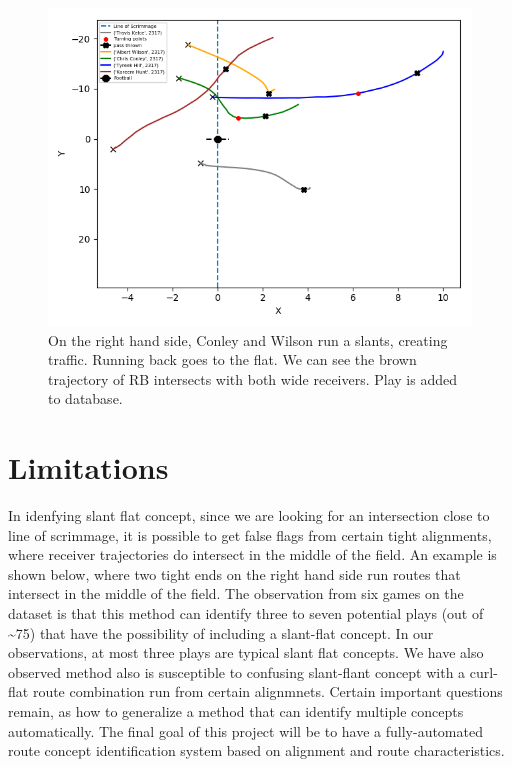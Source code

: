 \documentclass[12pt,oneside]{dukestatscithesis}
\theoremstyle{definition}
\theoremstyle{definition}
\theoremstyle{definition}
\theoremstyle{remark}
\begin{document}
\begin{figure}
\includegraphics[width=8.89in,angle=360, scale=0.6]{figure/2317} \caption{On the right hand side, Conley and Wilson run a slants, creating traffic. Running back goes to the flat. We can see the brown trajectory of RB intersects with both wide receivers. Play is added to database.}\label{fig:slantflat2}
\end{figure}
\section{Limitations}\label{limitations}

In idenfying slant flat concept, since we are looking for an
intersection close to line of scrimmage, it is possible to get false
flags from certain tight alignments, where receiver trajectories do
intersect in the middle of the field. An example is shown below, where
two tight ends on the right hand side run routes that intersect in the
middle of the field. The observation from six games on the dataset is
that this method can identify three to seven potential plays (out of
\textasciitilde{}75) that have the possibility of including a slant-flat
concept. In our observations, at most three plays are typical slant flat
concepts. We have also observed method also is susceptible to confusing
slant-flant concept with a curl-flat route combination run from certain
alignmnets. Certain important questions remain, as how to generalize a
method that can identify multiple concepts automatically. The final goal
of this project will be to have a fully-automated route concept
identification system based on alignment and route characteristics.
\end{document}
